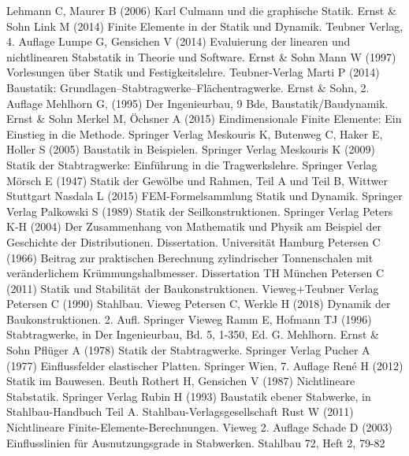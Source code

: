 \begin{thebibliography}{}
 Lehmann C, Maurer B (2006) Karl Culmann und die graphische Statik. Ernst \& Sohn
 Link M (2014) Finite Elemente in der Statik und Dynamik. Teubner Verlag, 4. Auflage
 Lumpe G, Gensichen V (2014) Evaluierung der linearen und nichtlinearen Stabstatik in Theorie und Software. Ernst \& Sohn
 Mann W (1997) Vorlesungen \"{u}ber Statik und Festigkeitslehre. Teubner-Verlag
 Marti P (2014) Baustatik: Grundlagen--Stabtragwerke--Fl\"{a}chentragwerke. Ernst \& Sohn, 2. Auflage
 Mehlhorn G, (1995) Der Ingenieurbau, 9 Bde, Baustatik/Baudynamik. Ernst \& Sohn
 Merkel M, \"{O}chsner A (2015) Eindimensionale Finite Elemente: Ein Einstieg in die Methode. Springer Verlag
 Meskouris K, Butenweg C, Haker E, Holler S (2005) Baustatik in Beispielen. Springer Verlag
 Meskouris K (2009) Statik der Stabtragwerke: Einf\"{u}hrung in die Tragwerkslehre. Springer Verlag
 M\"{o}rsch E (1947) Statik der Gew\"{o}lbe und Rahmen, Teil A und Teil B, Wittwer Stuttgart
 Nasdala L (2015) FEM-Formelsammlung Statik und Dynamik. Springer Verlag
 Palkowski S (1989) Statik der Seilkonstruktionen. Springer Verlag
 Peters K-H (2004) Der Zusammenhang von Mathematik und Physik am Beispiel der Geschichte der Distributionen. Dissertation. Universit\"{a}t Hamburg
 Petersen C (1966) Beitrag zur praktischen Berechnung zylindrischer Tonnenschalen mit ver\"{a}nderlichem Kr\"{u}mmungshalbmesser. Dissertation TH M\"{u}nchen
 Petersen C (2011) Statik und Stabilit\"{a}t der Baukonstruktionen. Vieweg+Teubner Verlag
 Petersen C (1990) Stahlbau. Vieweg
 Petersen C, Werkle H (2018) Dynamik der Baukonstruktionen. 2. Aufl. Springer Vieweg
 Ramm E, Hofmann TJ (1996) Stabtragwerke, in Der Ingenieurbau, Bd. 5, 1-350, Ed. G. Mehlhorn. Ernst \& Sohn
 Pfl\"{u}ger A (1978) Statik der Stabtragwerke. Springer Verlag
 Pucher A (1977) Einflussfelder elastischer Platten. Springer Wien, 7. Auflage
 Ren\'{e} H (2012) Statik im Bauwesen. Beuth
 Rothert H, Gensichen V (1987) Nichtlineare Stabstatik. Springer Verlag
 Rubin H (1993) Baustatik ebener Stabwerke, in Stahlbau-Handbuch Teil A. Stahlbau-Verlagsgesellschaft
 Rust W (2011) Nichtlineare Finite-Elemente-Berechnungen. Vieweg 2. Auflage
 Schade D (2003) \lqq Einflusslinien f\"{u}r Ausnutzungsgrade in Stabwerken\rqq. Stahlbau 72, Heft 2, 79-82

\end{thebibliography}
